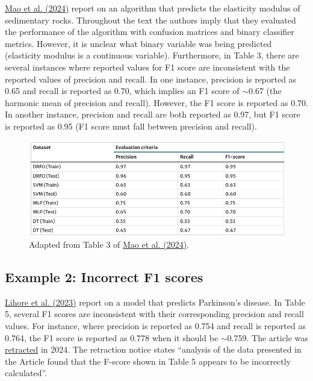 \documentclass[letterpaper, 12pt]{article}
\begin{document}
\href{https://doi.org/10.1007/s12665-024-11768-y}{Mao et al. (2024)} report on an algorithm that predicts the elasticity modulus of sedimentary rocks. Throughout the text the authors imply that they evaluated the performance of the algorithm with confusion matrices and binary classifier metrics. However, it is unclear what binary variable was being predicted (elasticity modulus is a continuous variable). Furthermore, in Table 3, there are several instances where reported values for F1 score are inconsistent with the reported values of precision and recall. In one instance, precision is reported as 0.65 and recall is reported as 0.70, which implies an F1 score of $\sim$0.67 (the harmonic mean of precision and recall). However, the F1 score is reported as 0.70. In another instance, precision and recall are both reported as 0.97, but F1 score is reported as 0.95 (F1 score must fall between precision and recall).

\begin{figure}[h!tbp]
    \centering
    \includegraphics[width=\textwidth]{img/classifier_eval/mao_et_al_table_3.png}
    \caption*{Adapted from Table 3 of \href{https://doi.org/10.1007/s12665-024-11768-y}{Mao et al. (2024)}.}
\end{figure}

\pagebreak

\subsection*{Example 2: Incorrect F1 scores}

\href{https://doi.org/10.1038/s41598-023-41314-y}{Lihore et al. (2023)} report on a model that predicts Parkinson's disease. In Table 5, several F1 scores are inconsistent with their corresponding precision and recall values. For instance, where precision is reported as 0.754 and recall is reported as 0.764, the F1 score is reported as 0.778 when it should be $\sim$0.759. The article was \href{https://doi.org/10.1038/s41598-024-78418-y}{retracted} in 2024. The retraction notice states ``analysis of the data presented in the Article found that the F-score shown in Table 5 appears to be incorrectly calculated''.
\end{document}

